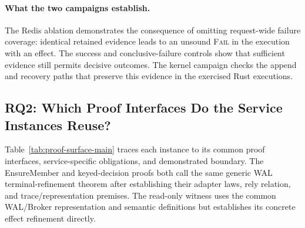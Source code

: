 \documentclass[acmsmall,screen,review,anonymous]{acmart}
\newcommand{\Fail}{\textsc{Fail}\xspace}
\begin{document}
\paragraph{What the two campaigns establish.}
The Redis ablation demonstrates the consequence of omitting request-wide
failure coverage: identical retained evidence leads to an unsound \Fail
in the execution with an effect. The success and conclusive-failure controls
show that sufficient evidence still permits decisive outcomes. The kernel
campaign checks the append and recovery paths that preserve this evidence
in the exercised Rust executions.

\subsection{RQ2: Which Proof Interfaces Do the Service Instances Reuse?}

Table~\ref{tab:proof-surface-main} traces each instance to its common
proof interfaces, service-specific obligations, and demonstrated boundary. The
EnsureMember and keyed-decision proofs both call the same generic
WAL terminal-refinement theorem after establishing their adapter laws,
rely relation, and trace/representation premises. The read-only witness
uses the common WAL/Broker representation and semantic definitions but
establishes its concrete effect refinement directly.
\end{document}
